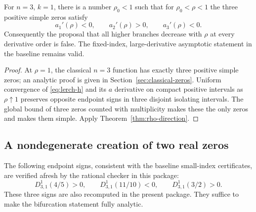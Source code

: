 \begin{corollary}
\label{cor:increasing-middle}
For $n=3$, $k=1$, there is a number $\rho_0<1$ such that for
$\rho_0<\rho<1$ the three positive simple zeros satisfy
\[
 a_1'(\rho)<0,\qquad a_2'(\rho)>0,\qquad a_3'(\rho)<0.
\]
Consequently the proposal that all higher branches decrease with $\rho$
at every derivative order is false. The fixed-index, large-derivative
asymptotic statement in the baseline remains valid.
\end{corollary}
\begin{proof}
At $\rho=1$, the classical $n=3$ function has exactly three positive
simple zeros; an analytic proof is given in Section~\ref{sec:classical-zeros}.
Uniform convergence of \eqref{eq:lerch-h} and its $a$ derivative on
compact positive intervals as $\rho\uparrow1$ preserves opposite
endpoint signs in three disjoint isolating intervals. The global bound
of three zeros counted with multiplicity makes these the only zeros
and makes them simple. Apply Theorem~\ref{thm:rho-direction}.
\end{proof}

\subsection{A nondegenerate creation of two real zeros}
The following endpoint signs, consistent with the baseline small-index certificates, are verified afresh by the rational checker in this package:
\[
 D_{3,1}^1(4/5)>0,\qquad D_{3,1}^1(11/10)<0,\qquad
 D_{3,1}^1(3/2)>0.
\]
These three signs are also recomputed in the present package. They
suffice to make the bifurcation statement fully analytic.

